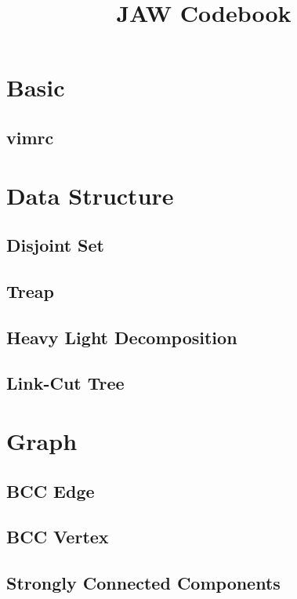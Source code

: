 \documentclass[a4paper,10pt,twocolumn,oneside]{article}
\title{JAW Codebook}
\author{}
\date{}
\begin{document}
\maketitle
\tableofcontents

\section{Basic}
\subsection{vimrc}


\section{Data Structure}
\subsection{Disjoint Set}

\subsection{Treap}

\subsection {Heavy Light Decomposition}

\subsection {Link-Cut Tree}


\section{Graph}
\subsection{BCC Edge}

\subsection{BCC Vertex}

\subsection{Strongly Connected Components}

\end{document}

